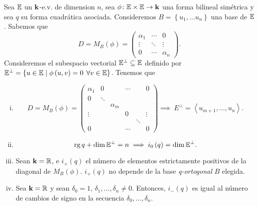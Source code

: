 \begin{prop} 
    Sea $\mathbb{E}$ un $\mathbf{k}$-e.v. de dimension $n$, sea $\phi \colon \mathbb{E} \times \mathbb{E} \to \mathbf{k}$
    una forma bilineal simétrica y sea $q$ su forma cuadrática asociada.
    Consideremos $B=\left\{ u_1, \dots u_n\right\}$ una base  de $\mathbb{E}$. 
    Sabemos que
    \[
        D=M_B \left( \phi \right)= \left(
        \begin{array}{ccc}
            \alpha _1 & \cdots & 0 \\
            \vdots & \ddots & \vdots \\
            0 & \cdots & \alpha _n 
        \end{array} \right).
    \]
    Consideremos el subespacio vectorial $\mathbb{E} ^{\perp} \subseteq \mathbb{E}$ definido por
    $\E ^{\perp}= \left\{u \in \E \hspace{0,1cm} | \hspace{0,1cm} \phi \left( u, v \right)
    = 0 \hspace{0,15cm} \forall v \in \E \right\}$. Tenemos que
    \begin{enumerate}[i)]
        \item
            \[
                D=M_B \left( \phi \right)= \left(
                \begin{array}{cccccc}
                    \alpha _1 & 0 &  & \cdots &  & 0 \\
                    0 & \ddots &  &  &  &  \\
                     &  & \alpha _m &  &  & \\
                    \vdots &  &  & 0 &  & \vdots  \\
                     &  & \ &  & \ddots &  \\
                    0 &  &  & \cdots &  & 0 
                \end{array} \right) \implies\ E ^{\perp} =
                \left< u_{m+1} , \dots , u_n \right> .
            \]
        \item
            \[
                \operatorname{rg} q + \dim \mathbb{E}^{\perp} = n \implies i_0 \left( q \right)
                 = \dim \mathbb{E}^{\perp}.
            \]
        \item Sean $\mathbf{k}=\mathbb{R}$,  e $i_+ \left( q \right)$ el número de elementos estrictamente positivos de
        la diagonal de $M_B \left( \phi \right)$. $i_+ \left( q \right)$ no depende de la base
        \emph{q-ortogonal} $B$ elegida.
        \item Sea $\mathbf{k}=\mathbb{R}$ y sean $\delta _0 = 1$, $\delta _1, \dots , \delta _n \neq 0$.
        Entonces, $i_- \left( q \right)$ es igual al número de cambios de signo en la
        secuencia $\delta _0, \dots , \delta _n$.
    \end{enumerate}
\end{prop}

